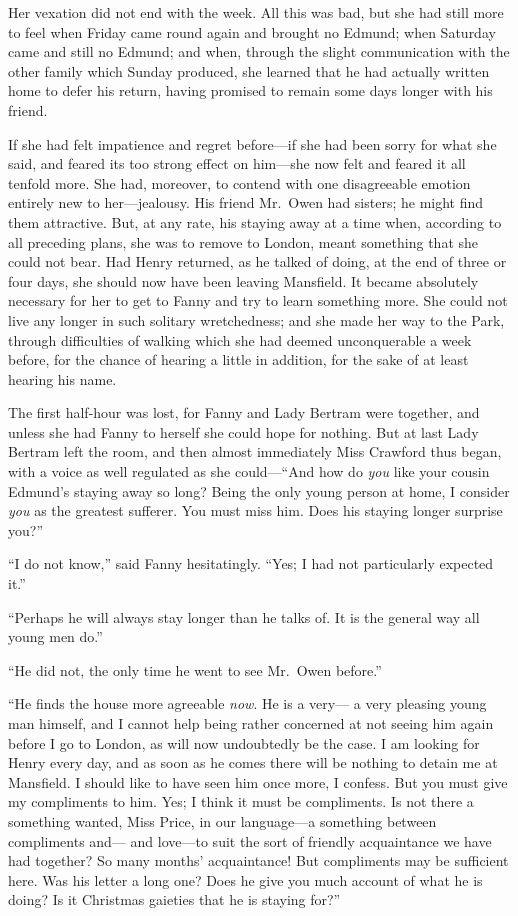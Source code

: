 Her vexation did not end with the week.  All this was bad,
but she had still more to feel when Friday came round
again and brought no Edmund; when Saturday came and still
no Edmund; and when, through the slight communication
with the other family which Sunday produced, she learned
that he had actually written home to defer his return,
having promised to remain some days longer with his friend.

If she had felt impatience and regret before---if she had
been sorry for what she said, and feared its too strong
effect on him---she now felt and feared it all tenfold more.
She had, moreover, to contend with one disagreeable emotion
entirely new to her---jealousy.  His friend Mr.\ Owen had sisters;
he might find them attractive.  But, at any rate, his staying
away at a time when, according to all preceding plans,
she was to remove to London, meant something that she could
not bear.  Had Henry returned, as he talked of doing,
at the end of three or four days, she should now have
been leaving Mansfield.  It became absolutely necessary
for her to get to Fanny and try to learn something more.
She could not live any longer in such solitary wretchedness;
and she made her way to the Park, through difficulties
of walking which she had deemed unconquerable a week before,
for the chance of hearing a little in addition, for the
sake of at least hearing his name.

The first half-hour was lost, for Fanny and Lady Bertram
were together, and unless she had Fanny to herself she could
hope for nothing.  But at last Lady Bertram left the room,
and then almost immediately Miss Crawford thus began,
with a voice as well regulated as she could---``And how do
\emph{you} like your cousin Edmund's staying away so long?
Being the only young person at home, I consider \emph{you}
as the greatest sufferer.  You must miss him.  Does his
staying longer surprise you?''

``I do not know,'' said Fanny hesitatingly.  ``Yes; I had
not particularly expected it.''

``Perhaps he will always stay longer than he talks of.
It is the general way all young men do.''

``He did not, the only time he went to see Mr.\ Owen before.''

``He finds the house more agreeable \emph{now}. He is a very---%
a very pleasing young man himself, and I cannot help
being rather concerned at not seeing him again before I
go to London, as will now undoubtedly be the case.
I am looking for Henry every day, and as soon as he
comes there will be nothing to detain me at Mansfield.
I should like to have seen him once more, I confess.
But you must give my compliments to him.  Yes; I think it must
be compliments.  Is not there a something wanted, Miss Price,
in our language---a something between compliments and---%
and love---to suit the sort of friendly acquaintance we have
had together?  So many months' acquaintance!  But compliments
may be sufficient here.  Was his letter a long one?
Does he give you much account of what he is doing?
Is it Christmas gaieties that he is staying for?''

